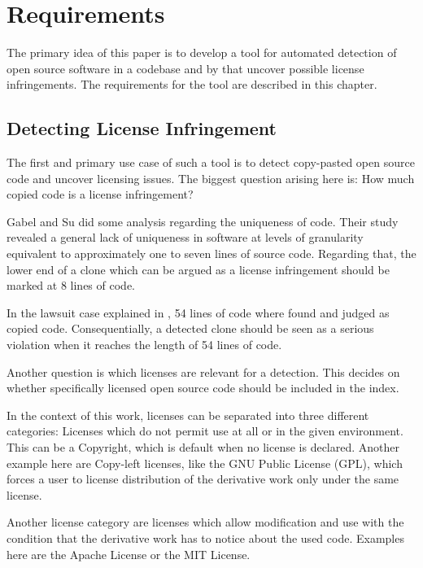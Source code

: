 
\chapter{Requirements}\label{chapter:requirements}
The primary idea of this paper is to develop a tool for automated detection of open source software in a codebase and by that uncover possible license infringements.
The requirements for the tool are described in this chapter.

\section{Detecting License Infringement}\label{section:requirements/detecting_infringment}
The first and primary use case of such a tool is to detect copy-pasted open source code and uncover licensing issues.
The biggest question arising here is: How much copied code is a license infringement?

Gabel and Su did some analysis regarding the uniqueness of code.
Their study \glqq revealed a general lack of uniqueness in software at levels of granularity equivalent to approximately one to seven lines of source code\grqq \cite{2010-gabel-su-source-code-uniqueness}.
Regarding that, the lower end of a clone which can be argued as a license infringement should be marked at 8 lines of code.

In the lawsuit case explained in \cite{mertzel2008copying}, 54 lines of code where found and judged as copied code.
Consequentially, a detected clone should be seen as a serious violation when it reaches the length of 54 lines of code.

Another question is which licenses are relevant for a detection.
This decides on whether specifically licensed open source code should be included in the index.

In the context of this work, licenses can be separated into three different categories:
Licenses which do not permit use at all or in the given environment.
This can be a Copyright, which is default when no license is declared.
Another example here are Copy-left licenses, like the GNU Public License (GPL), which forces a user to license distribution of the derivative work only under the same license.

Another license category are licenses which allow modification and use with the condition that the derivative work has to notice about the used code.
Examples here are the Apache License or the MIT License.

